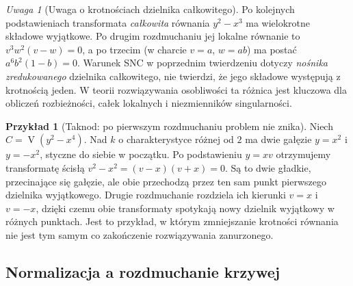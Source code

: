 \documentclass[11pt,a4paper,openany]{report}
\numberwithin{equation}{section}
\theoremstyle{plain}
\theoremstyle{definition}
\newtheorem{przyklad}[twierdzenie]{Przykład}
\theoremstyle{remark}
\newtheorem{uwaga}[twierdzenie]{Uwaga}
\newcommand{\V}{\operatorname V}
\begin{document}
\begin{uwaga}[Uwaga o krotnościach dzielnika całkowitego]
Po kolejnych podstawieniach transformata \emph{całkowita}
równania $y^2-x^3$ ma wielokrotne składowe wyjątkowe.
Po drugim rozdmuchaniu jej lokalne równanie to
$v^3w^2(v-w)=0$, a po trzecim (w charcie $v=a$,
$w=ab$) ma postać $a^6b^2(1-b)=0$.
Warunek SNC w poprzednim twierdzeniu dotyczy
\emph{nośnika zredukowanego} dzielnika całkowitego,
nie twierdzi, że jego składowe występują z krotnością jeden.
W teorii rozwiązywania osobliwości ta różnica jest
kluczowa dla obliczeń rozbieżności, całek lokalnych
i niezmienników singularności.
\end{uwaga}

\begin{przyklad}[Taknod: po pierwszym rozdmuchaniu problem nie znika]
Niech $C=\V(y^2-x^4)$. Nad $k$ o charakterystyce
różnej od $2$ ma dwie gałęzie $y=x^2$ i $y=-x^2$,
styczne do siebie w początku. Po podstawieniu
$y=xv$ otrzymujemy transformatę ścisłą
$v^2-x^2=(v-x)(v+x)=0$. Są to dwie gładkie,
przecinające się gałęzie, ale obie przechodzą
przez ten sam punkt pierwszego dzielnika wyjątkowego.
Drugie rozdmuchanie rozdziela ich kierunki
$v=x$ i $v=-x$, dzięki czemu obie transformaty
spotykają nowy dzielnik wyjątkowy w różnych punktach.
Jest to przykład, w którym zmniejszanie krotności
równania nie jest tym samym co zakończenie
rozwiązywania zanurzonego.
\end{przyklad}

\subsection{Normalizacja a rozdmuchanie krzywej}
\end{document}

